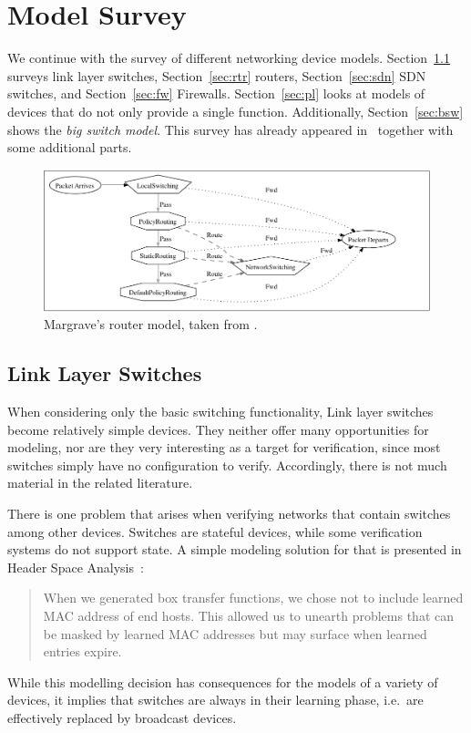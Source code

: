 \section{Model Survey}\label{sec:surv}
We continue with the survey of different networking device models.
Section~\ref{sec:sw} surveys link layer switches, Section~\ref{sec:rtr} routers, Section~\ref{sec:sdn} SDN switches, and Section~\ref{sec:fw} Firewalls.
Section~\ref{sec:pl} looks at models of devices that do not only provide a single function.
Additionally, Section~\ref{sec:bsw} shows the \emph{big switch model}.
This survey has already appeared in~\cite{michaelis2016middlebox} together with some additional parts.
\begin{figure}
	\includegraphics{fig/rtr.pdf}
	\caption{Margrave's router model, taken from \cite{nelson2010margrave}.}
	\label{fig:margraverouter}
\end{figure}
\subsection{Link Layer Switches}\label{sec:sw}
When considering only the basic switching functionality, Link layer switches become relatively simple devices.
They neither offer many opportunities for modeling, nor are they very interesting as a target for verification, since most switches simply have no configuration to verify.
Accordingly, there is not much material in the related literature.

There is one problem that arises when verifying networks that contain switches among other devices.
Switches are stateful devices, while some verification systems do not support state.
A simple modeling solution for that is presented in Header Space Analysis~\cite{kazemian12header}:
\begin{quote}
	When we generated box transfer functions, we
	chose not to include learned MAC address of end hosts.
	This allowed us to unearth problems that can be masked
	by learned MAC addresses but may surface when learned
	entries expire.
\end{quote}
While this modelling decision has consequences for the models of a variety of devices, it implies that switches are always in their learning phase, i.e.\ are effectively replaced by broadcast devices.

